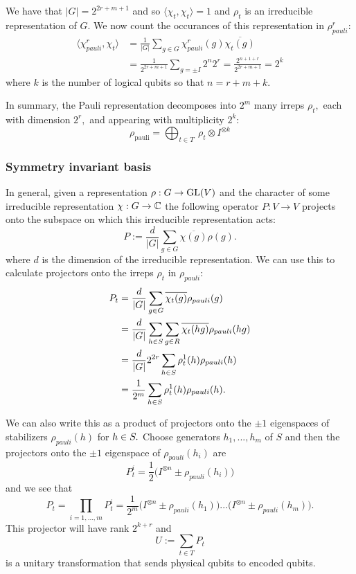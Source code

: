 We have that $|G|=2^{2r+m+1}$ and so
$\langle\chi_{t},\chi_{t}\rangle = 1$ and
$\rho_t$ is an irreducible representation of $G.$
We now count the occurances of 
this representation in $\rho^r_{pauli}$:
\begin{align*}
\langle\chi^r_{pauli},\chi_{t}\rangle &= \frac{1}{|G|}\sum_{g\in G} \chi^r_{pauli}(g)\overline{\chi_{t}(g)} \\
&= \frac{1}{2^{2r+m+1}} \sum_{g=\pm I} 2^n 2^r = \frac{2^{n+1+r}}{2^{2r+m+1}} = 2^k
\end{align*}
where $k$ is the number of logical qubits so that $n=r+m+k.$

In summary, the Pauli representation decomposes into 
$2^m$ many irreps $\rho_t,$ 
each with dimension $2^r,$ 
and appearing with multiplicity $2^k:$
$$
    \rho_{\mathrm{pauli}} = 
        \bigoplus_{t\in T}\ \rho_t \otimes I^{\otimes k}
$$

\subsubsection{Symmetry invariant basis}

In general, given a representation $\rho:G\to \mathrm{GL}(V)$
and the character of some irreducible representation $\chi:G\to \mathbb{C}$
the following operator 
$P:V\to V$
projects onto the subspace on which
this irreducible representation acts:
$$
    P := \frac{d}{|G|} \sum_{g\in G} {\overline{\chi(g)}} \rho(g).
$$
where $d$ is the dimension of the irreducible representation.
We can use this to calculate projectors onto the irreps $\rho_t$ in $\rho_{pauli}$:
\begin{align*}
P_t &= \frac{d}{|G|} \sum_{g\in G} \overline{\chi_t(g)} \rho_{pauli}(g) \\
    &= \frac{d}{|G|} \sum_{h\in S}\sum_{g\in R} \overline{\chi_t(hg)} \rho_{pauli}(hg) \\
    &= \frac{d}{|G|} 2^{2r} \sum_{h\in S} {\rho^1_t(h)} \rho_{pauli}(h) \\
    &= \frac{1}{2^m} \sum_{h\in S} {\rho^1_t(h)} \rho_{pauli}(h).
\end{align*}

We can also write this as a product of projectors onto
the $\pm 1$ eigenspaces of stabilizers $\rho_{pauli}(h)$ for $h\in S.$
Choose generators $h_1,...,h_m$ of $S$
and then the projectors onto the $\pm 1$ eigenspace of $\rho_{pauli}(h_i)$ are
$$
P^i_t = \frac{1}{2} \bigl(I^{\otimes n} \pm \rho_{pauli}(h_i) \bigr)
$$
and we see that 
$$
P_t = \prod_{i=1,...,m} P^i_t 
    = \frac{1}{2^m} \bigl(I^{\otimes n} \pm \rho_{pauli}(h_1)\bigr)
    ...\bigl(I^{\otimes n} \pm \rho_{pauli}(h_m)\bigr).
$$
This projector will have rank $2^{k+r}$ and
$$
U := \sum_{t\in T} P_t
$$
is a unitary transformation that sends
physical qubits to encoded qubits.


